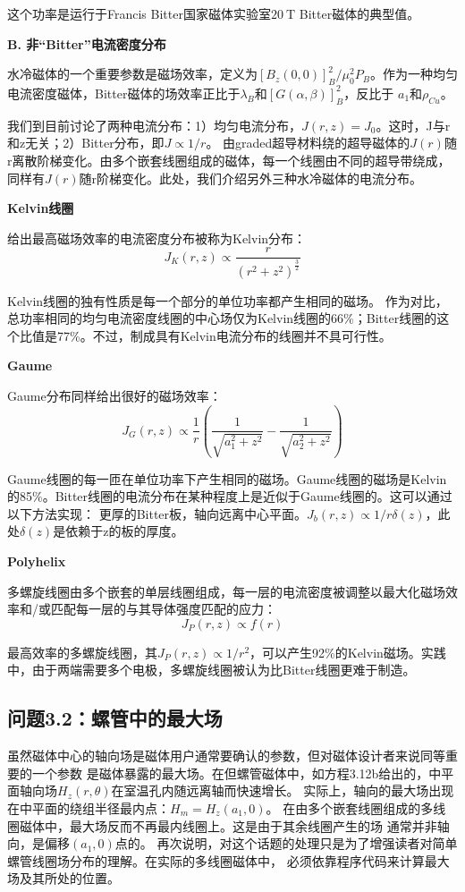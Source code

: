这个功率是运行于Francis Bitter国家磁体实验室$20\ \mathrm{T}$ Bitter磁体的典型值。

\textbf{B. 非“Bitter”电流密度分布}

水冷磁体的一个重要参数是磁场效率，定义为$[B_z(0,0)]_B^2/\mu_0^2 P_B$。作为一种均匀电流密度磁体，Bitter磁体的场效率正比于$\lambda_B$和$[G(\alpha,\beta)]_B^2$，反比于
$a_1$和$\rho_{Cu}$。

我们到目前讨论了两种电流分布：1）均匀电流分布，$J(r,z)=J_0$。这时，J与r和z无关；2）Bitter分布，即$J\propto 1/r$。
由graded超导材料绕的超导磁体的$J(r)$随r离散阶梯变化。由多个嵌套线圈组成的磁体，每一个线圈由不同的超导带绕成，同样有$J(r)$随r阶梯变化。此处，我们介绍另外三种水冷磁体的电流分布。

\textbf{Kelvin线圈}

给出最高磁场效率的电流密度分布被称为Kelvin分布：
\begin{equation}
J_K(r,z)\propto\frac{r}{(r^2+z^2)^\frac{3}{2}}%
\end{equation}

Kelvin线圈的独有性质是每一个部分的单位功率都产生相同的磁场。
作为对比，总功率相同的均匀电流密度线圈的中心场仅为Kelvin线圈的66\%；Bitter线圈的这个比值是77\%。不过，制成具有Kelvin电流分布的线圈并不具可行性。

\textbf{Gaume}

Gaume分布同样给出很好的磁场效率：
\begin{equation}
J_G(r,z)\propto\frac{1}{r}\left(\frac{1}{\sqrt{a_1^2+z^2}}-\frac{1}{\sqrt{a_2^2+z^2}}\right)%
\end{equation}

Gaume线圈的每一匝在单位功率下产生相同的磁场。Gaume线圈的磁场是Kelvin的85\%。Bitter线圈的电流分布在某种程度上是近似于Gaume线圈的。这可以通过以下方法实现：
更厚的Bitter板，轴向远离中心平面。$J_b(r,z)\propto 1/r\delta(z)$，此处$\delta(z)$是依赖于z的板的厚度。

\textbf{Polyhelix}

多螺旋线圈由多个嵌套的单层线圈组成，每一层的电流密度被调整以最大化磁场效率和/或匹配每一层的与其导体强度匹配的应力：
\begin{equation}
J_P(r,z)\propto f(r)%
\end{equation}

最高效率的多螺旋线圈，其$J_P(r,z)\propto 1/r^2$，可以产生92\%的Kelvin磁场。实践中，由于两端需要多个电极，多螺旋线圈被认为比Bitter线圈更难于制造。
\newpage


\subsection{问题3.2：螺管中的最大场}
虽然磁体中心的轴向场是磁体用户通常要确认的参数，但对磁体设计者来说同等重要的一个参数
是磁体暴露的最大场。在但螺管磁体中，如方程3.12b给出的，中平面轴向场$H_z(r,
\theta)$在室温孔内随远离轴而快速增长。
实际上，轴向的最大场出现在中平面的绕组半径最内点：$H_m=H_z(a_1,0)$。
在由多个嵌套线圈组成的多线圈磁体中，最大场反而不再最内线圈上。这是由于其余线圈产生的场
通常并非轴向，是偏移$(a_1,0)$点的。
再次说明，对这个话题的处理只是为了增强读者对简单螺管线圈场分布的理解。在实际的多线圈磁体中，
必须依靠程序代码来计算最大场及其所处的位置。

